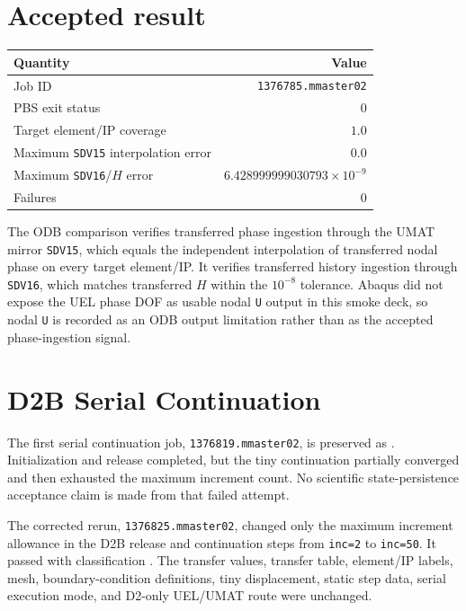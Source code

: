 \documentclass[11pt,a4paper]{article}
\begin{document}
\section{Accepted result}
\begin{table}[h]
\centering
\begin{tabular}{@{}lr@{}}
\toprule
Quantity & Value \\
\midrule
Job ID & \texttt{1376785.mmaster02} \\
PBS exit status & $0$ \\
Target element/IP coverage & $1.0$ \\
Maximum \texttt{SDV15} interpolation error & $0.0$ \\
Maximum \texttt{SDV16}/$H$ error & $6.428999999030793\times10^{-9}$ \\
Failures & $0$ \\
\bottomrule
\end{tabular}
\end{table}

The ODB comparison verifies transferred phase ingestion through the UMAT mirror
\texttt{SDV15}, which equals the independent interpolation of transferred nodal
phase on every target element/IP. It verifies transferred history ingestion
through \texttt{SDV16}, which matches transferred $H$ within the $10^{-8}$
tolerance. Abaqus did not expose the UEL phase DOF as usable nodal
\texttt{U} output in this smoke deck, so nodal \texttt{U} is recorded as an ODB
output limitation rather than as the accepted phase-ingestion signal.

\section{D2B Serial Continuation}
The first serial continuation job, \texttt{1376819.mmaster02}, is preserved as
. Initialization and release
completed, but the tiny continuation partially converged and then exhausted the
maximum increment count. No scientific state-persistence acceptance claim is
made from that failed attempt.

The corrected rerun, \texttt{1376825.mmaster02}, changed only the maximum
increment allowance in the D2B release and continuation steps from
\texttt{inc=2} to \texttt{inc=50}. It passed with classification
. The transfer values, transfer table,
element/IP labels, mesh, boundary-condition definitions, tiny displacement,
static step data, serial execution mode, and D2-only UEL/UMAT route were
unchanged.
\end{document}
